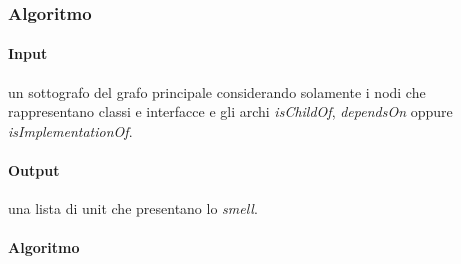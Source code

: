     \subsubsection{Algoritmo}
        \paragraph{Input} un sottografo del grafo principale considerando solamente i nodi che rappresentano classi e interfacce e gli archi \textit{isChildOf}, \textit{dependsOn} oppure \textit{isImplementationOf}. 
        
        \paragraph{Output} una lista di unit che presentano lo \textit{smell}.
        
        \paragraph{Algoritmo}
        
    